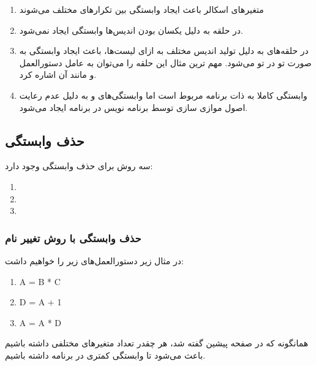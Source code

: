 \documentclass[20pt, a4paper]{article}
\begin{document}
\begin{enumerate}
    \item متغیرهای اسکالر باعث ایجاد وابستگی بین تکرار‌های مختلف می‌شوند
    \item در حلقه  به دلیل یکسان بودن اندیس‌ها وابستگی ایجاد نمی‌شود.
    \item در حلقه‌های  به دلیل تولید اندیس مختلف به ازای لیست‌ها،
    باعث ایجاد وابستگی به صورت تو در تو می‌شود. مهم ترین مثال این حلقه‌ را
    می‌توان به عامل دستورالعمل  و مانند آن اشاره کرد.
    \item وابستگی  کاملا به ذات برنامه مربوط است اما وابستگی‌های
     و  به دلیل عدم رعایت اصول موازی سازی توسط
    برنامه نویس در برنامه ایجاد می‌شود.
\end{enumerate}

\subsection{حذف وابستگی}

سه روش برای حذف وابستگی وجود دارد:

\begin{enumerate}
    \item {}
    \item {}
    \item {}
\end{enumerate}

\subsubsection{حذف وابستگی با روش تغییر نام}

در مثال زیر دستورالعمل‌های زیر را خواهیم داشت:

\begin{LTR}
    \begin{enumerate}
        \item A = B * C
        \item D = A + 1
        \item A = A * D
    \end{enumerate}
\end{LTR}


همانگونه که در صفحه پیشین گفته شد، هر چقدر تعداد متغیر‌های مختلفی داشته باشیم
باعث می‌شود تا وابستگی کمتری در برنامه داشته باشیم.
\end{document}
